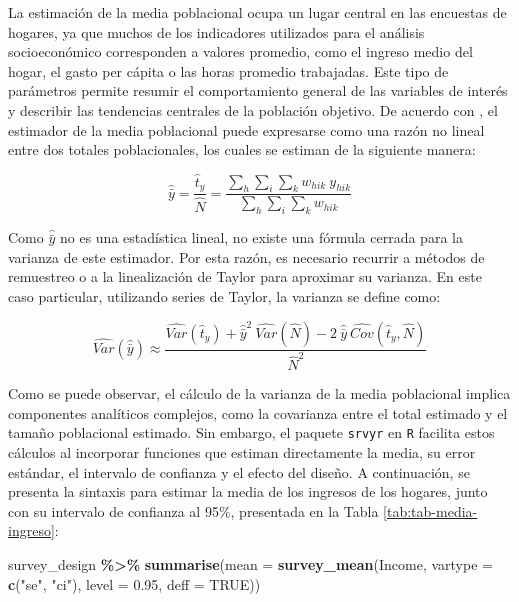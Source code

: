\documentclass[
  spanish,
  12pt,
]{book}
\newenvironment{Shaded}{\begin{snugshade}}{\end{snugshade}}
\newcommand{\AttributeTok}[1]{\textcolor[rgb]{0.13,0.29,0.53}{#1}}
\newcommand{\ConstantTok}[1]{\textcolor[rgb]{0.56,0.35,0.01}{#1}}
\newcommand{\FloatTok}[1]{\textcolor[rgb]{0.00,0.00,0.81}{#1}}
\newcommand{\FunctionTok}[1]{\textcolor[rgb]{0.13,0.29,0.53}{\textbf{#1}}}
\newcommand{\NormalTok}[1]{#1}
\newcommand{\SpecialCharTok}[1]{\textcolor[rgb]{0.81,0.36,0.00}{\textbf{#1}}}
\newcommand{\StringTok}[1]{\textcolor[rgb]{0.31,0.60,0.02}{#1}}
\begin{document}
La estimación de la media poblacional ocupa un lugar central en las encuestas de hogares, ya que muchos de los indicadores utilizados para el análisis socioeconómico corresponden a valores promedio, como el ingreso medio del hogar, el gasto per cápita o las horas promedio trabajadas. Este tipo de parámetros permite resumir el comportamiento general de las variables de interés y describir las tendencias centrales de la población objetivo. De acuerdo con \citet{Gutierrez2016}, el estimador de la media poblacional puede expresarse como una razón no lineal entre dos totales poblacionales, los cuales se estiman de la siguiente manera:

\[
\hat{\bar{y}}=  \frac{\hat{t}_y}{\hat{N}}  =  \frac{\sum_{h}\sum_{i}\sum_{k} w_{h i k} \ y_{hik}}{\sum_{h}\sum_{i}\sum_{k} w_{h i k}}
\]

Como \(\hat{\bar{y}}\) no es una estadística lineal, no existe una fórmula cerrada para la varianza de este estimador. Por esta razón, es necesario recurrir a métodos de remuestreo o a la linealización de Taylor para aproximar su varianza. En este caso particular, utilizando series de Taylor, la varianza se define como:

\[
\widehat{Var}\left(\hat{\bar{y}}\right)  \approx  \frac{\widehat{Var}\left(\hat{t}_y\right)+\hat{\bar{y}}^{2}\ \widehat{Var}\left(\hat{N}\right)-2\ \hat{\bar{y}} \  \widehat{Cov}\left(\hat{t}_y,\hat{N}\right)}{\hat{N}^{2}}
\]

Como se puede observar, el cálculo de la varianza de la media poblacional implica componentes analíticos complejos, como la covarianza entre el total estimado y el tamaño poblacional estimado. Sin embargo, el paquete \texttt{srvyr} en \texttt{R} facilita estos cálculos al incorporar funciones que estiman directamente la media, su error estándar, el intervalo de confianza y el efecto del diseño. A continuación, se presenta la sintaxis para estimar la media de los ingresos de los hogares, junto con su intervalo de confianza al 95\%, presentada en la Tabla \ref{tab:tab-media-ingreso}:

\begin{Shaded}
\begin{Highlighting}[]
\NormalTok{survey\_design }\SpecialCharTok{\%\textgreater{}\%}
  \FunctionTok{summarise}\NormalTok{(}\AttributeTok{mean =} \FunctionTok{survey\_mean}\NormalTok{(Income,}
                                \AttributeTok{vartype =} \FunctionTok{c}\NormalTok{(}\StringTok{"se"}\NormalTok{, }\StringTok{"ci"}\NormalTok{),}
                                \AttributeTok{level =} \FloatTok{0.95}\NormalTok{,}
                                \AttributeTok{deff =} \ConstantTok{TRUE}\NormalTok{))}
\end{Highlighting}
\end{Shaded}
\end{document}

